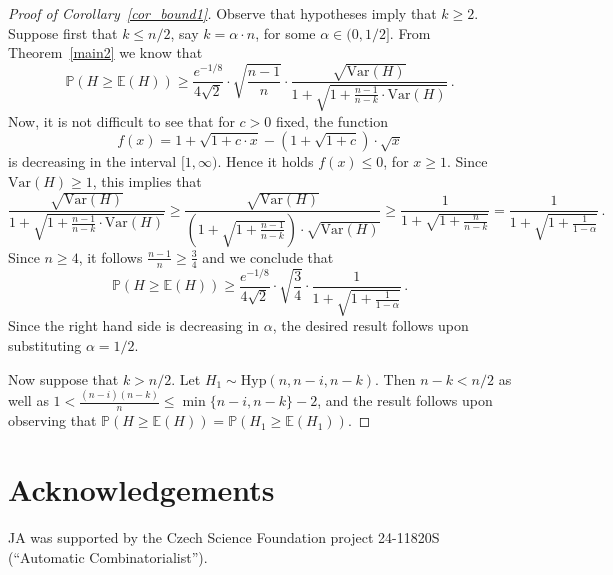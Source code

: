 \documentclass[10pt]{article}
\theoremstyle{plain}
\theoremstyle{definition}
\theoremstyle{remark}
\newcommand{\Prb}{\mathbb{P}}
\newcommand{\Exp}{\mathbb{E}}
\begin{document}
\begin{proof}[Proof of Corollary~\ref{cor_bound1}]
Observe that hypotheses imply that $k\ge 2$. 
Suppose first that $k\le n/2$, say  $k =\alpha\cdot n$, for some $\alpha\in (0,1/2]$. 
From Theorem~\ref{main2} we know that 
\[
\Prb(H\ge \Exp(H)) \ge \frac{e^{-1/8}}{4\sqrt{2}} \cdot \sqrt{\frac{n-1}{n}} \cdot\frac{ \sqrt{\text{Var}(H)} }{1 + \sqrt{1+\frac{n-1}{n-k}\cdot \text{Var}(H)}} \, .
\]
Now, it is not difficult to see that for $c>0$ fixed, the function 
\[
f(x)= 1 + \sqrt{1 + c\cdot x} - (1+\sqrt{1+c})\cdot \sqrt{x} 
\]
is decreasing in the interval $[1 , \infty)$. Hence it holds $f(x) \le 0$, for $x\ge 1$. 
Since $\text{Var}(H)\ge 1$,  this implies that  
\[
\frac{ \sqrt{\text{Var}(H)}  }{1 + \sqrt{1+\frac{n-1}{n-k}\cdot \text{Var}(H)}} \ge \frac{\sqrt{\text{Var}(H)}}{ \left(1+ \sqrt{1+\frac{n-1}{n-k}}\right)\cdot \sqrt{\text{Var}(H)} }  \ge \frac{1}{1+ \sqrt{1+\frac{n}{n-k}}}  = \frac{1}{1+\sqrt{1 + \frac{1}{1-\alpha}}}\, .
\]
Since $n\ge 4$, it follows  $\frac{n-1}{n}\ge \frac{3}{4}$ and we conclude that  
\[
\Prb(H\ge \Exp(H)) \ge \frac{e^{-1/8}}{4\sqrt{2}}\cdot \sqrt{\frac{3}{4}} \cdot\frac{1}{1+\sqrt{1+\frac{1}{1-\alpha}}}  \, .
\]
Since the right hand side is decreasing in $\alpha$, the desired result follows upon substituting $\alpha =1/2$. 

Now suppose that $k > n/2$. Let $H_1\sim \text{Hyp}(n,n-i,n-k)$. Then $n-k < n/2$ as well as $1<\frac{(n-i)(n-k)}{n}\le \min\{n-i,n-k\}-2$, and  the result follows upon observing  that 
$\Prb(H\ge \Exp(H)) = \Prb(H_1\ge \Exp(H_1))$.
\end{proof}







\section*{Acknowledgements}
JA was supported by the Czech Science Foundation project 24-11820S (“Automatic Combinatorialist”).
\end{document}
